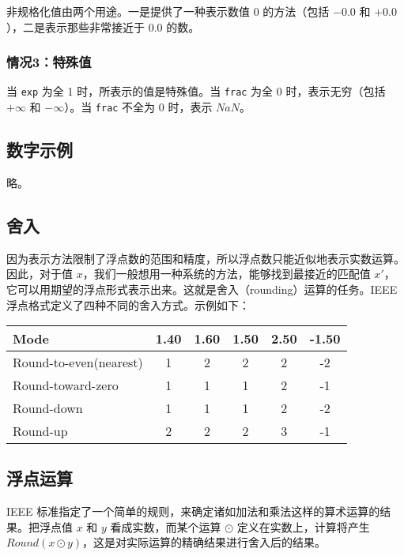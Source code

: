 非规格化值由两个用途。一是提供了一种表示数值 0 的方法（包括 $-0.0$ 和 $+0.0$），二是表示那些非常接近于 $0.0$ 的数。

\subsubsection{情况3：特殊值}

当 \verb|exp| 为全 1 时，所表示的值是特殊值。当 \verb|frac| 为全 0 时，表示无穷（包括 $+ \infty$ 和 $- \infty$）。当 \verb|frac| 不全为 0 时，表示 $NaN$。

\subsection{数字示例}

略。

\subsection{舍入}

因为表示方法限制了浮点数的范围和精度，所以浮点数只能近似地表示实数运算。因此，对于值 $x$，我们一般想用一种系统的方法，能够找到最接近的匹配值 $x'$，它可以用期望的浮点形式表示出来。这就是舍入（rounding）运算的任务。IEEE 浮点格式定义了四种不同的舍入方式。示例如下：

\begin{table}[!ht]
    \centering
    \begin{tabular}{lccccc}
        \toprule
        Mode & 1.40 & 1.60 & 1.50 & 2.50 & -1.50 \\
        \midrule
        Round-to-even(nearest)  & 1 & 2 & 2 & 2 & -2 \\
        Round-toward-zero       & 1 & 1 & 1 & 2 & -1 \\
        Round-down              & 1 & 1 & 1 & 2 & -2 \\
        Round-up                & 2 & 2 & 2 & 3 & -1 \\
        \bottomrule
    \end{tabular}
\end{table}

\subsection{浮点运算}

IEEE 标准指定了一个简单的规则，来确定诸如加法和乘法这样的算术运算的结果。把浮点值 $x$ 和 $y$ 看成实数，而某个运算 $\odot$ 定义在实数上，计算将产生 $Round(x \odot y)$，这是对实际运算的精确结果进行舍入后的结果。

